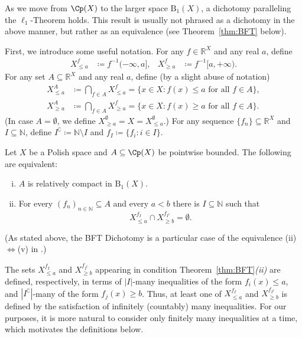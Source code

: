 As we move from $\Cp(X)$ to the larger space $\mathrm{B}_1(X)$, a dichotomy paralleling the $\ell_1$-Theorem holds.
This result is usually not phrased as a dichotomy in the above manner, but rather as an equivalence (see Theorem~\ref{thm:BFT} below).

First, we introduce some useful notation.
For any $f\in \mathbb{R}^X$ and any real $a$, define
\begin{align*}
    X^f_{\le a} &\coloneqq f^{-1}(-\infty,a], &
    X^f_{\ge a} &\coloneqq f^{-1}[a, +\infty).
\end{align*}
For any set $A\subseteq \mathbb{R}^X$ and any real $a$, define (by a slight abuse of notation)
\begin{align*}
    X^A_{\le a} &\coloneqq \bigcap_{f\in A}X^f_{\le a} = \{x\in X: \text{$f(x)\le a$ for all $f\in A$}\},\\
    X^A_{\ge a} &\coloneqq \bigcap_{f\in A}X^f_{\ge a} = \{x\in X: \text{$f(x)\ge a$ for all $f\in A$}\}.
\end{align*}
(In case $A=\emptyset$, we define $X^\emptyset_{\ge a} = X = X^\emptyset_{\le a}$.)
For any sequence $\{f_n\}\subseteq \mathbb{R}^X$ and $I\subseteq \mathbb{N}$, define $I^{\complement} \coloneqq \mathbb{N}\setminus I$ and $f_I \coloneqq \{f_i: i\in I\}$.

\begin{theorem}
\label{thm:BFT}
    Let $X$ be a Polish space and $A\subseteq \Cp(X)$ be pointwise bounded.
    The following are equivalent:
    \begin{enumerate}[(i)]
        \item $A$ is relatively compact in $\mathrm{B}_1(X)$.
        \item For every $(f_n)_{n\in\mathbb{N}}\subseteq A$ and every $a<b$ there is $I\subseteq\mathbb{N}$ such that
        \begin{equation*}
            X_{\le a}^{f_I} \cap X_{\ge b}^{f_{I^{\complement}}} = \emptyset.
        \end{equation*}
    \end{enumerate}
\end{theorem}
(As stated above, the BFT Dichotomy is a particular case of the equivalence (ii)$\Leftrightarrow$(v) in {\cite[Corollary 4G]{BFT_1978_PCompactBaire}}.)

The sets $X_{\le a}^{f_I}$ and $X_{\ge b}^{f_{I^{\complement}}}$ appearing in condition Theorem~\ref{thm:BFT}\emph{(ii)} are defined, respectively, in terms of $|I|$-many inequalities of the form $f_i(x)\le a$, and $|I^{\complement}|$-many of the form $f_j(x)\ge b$.
Thus, at least one of $X_{\le a}^{f_I}$ and $X_{\ge b}^{f_{I^{\complement}}}$ is defined by the satisfaction of infinitely (countably) many inequalities.
For our purposes, it is more natural to consider only finitely many inequalities at a time, which motivates the definitions below.

